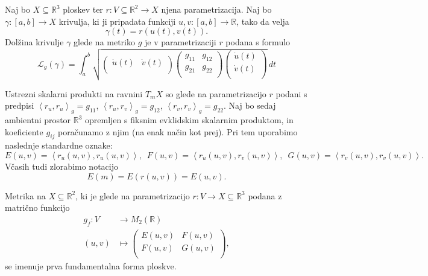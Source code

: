 \begin{definicija}
\label{def_dolzina_krivulje}
Naj bo $X \subseteq \mathbb{R}^3$ ploskev ter $r: V \subseteq \mathbb{R}^2 \to X$ njena parametrizacija. Naj bo $\gamma: [a,b] \to  X$ krivulja, ki ji pripadata funkciji $u, v: [a,b] \to  \mathbb{R}$, tako da velja \begin{equation*}
\gamma(t) = r(u(t), v(t)).
\end{equation*}  
   Dolžina krivulje $\gamma$ glede na metriko $g$ je v parametrizaciji $r$ podana s formulo 
\begin{equation*} \mathcal{L}_g(\gamma) = \int_{a}^{b} \sqrt{ 
\begin{pmatrix}
    \dot{u}(t) & \dot{v}(t) \\
\end{pmatrix}
\begin{pmatrix}
	g_{11} & g_{12}  \\
	g_{21} & g_{22} \\
\end{pmatrix}
\begin{pmatrix}
	\dot{u}(t) \\
	\dot{v}(t) \\
\end{pmatrix}
}  \, dt  \end{equation*}
\end{definicija}


Ustrezni skalarni produkti na ravnini $T_mX$ so glede na
parametrizacijo $r$ podani s predpisi $\left<r_u, r_u \right>_g  =
g_{11}$, $\left<r_u, r_v \right>_g  =
g_{12}$, $\left<r_v, r_v \right>_g  =
g_{22}$. Naj bo sedaj ambientni prostor $\mathbb{R}^3$ opremljen s
fiksnim evklidskim skalarnim produktom, in koeficiente $g_{ij}$
poračunamo z njim (na enak način kot prej). Pri tem uporabimo
naslednje standardne oznake: 
\begin{equation*} E(u,v) = \left<r_u(u,v), r_u(u,v) \right>,   \,\,\,   F(u,v) =  \left<r_u(u,v),
r_v(u,v) \right>, \,\,\,     G(u,v) =  \left<r_v(u,v), r_v(u,v)
\right>.  \end{equation*}
Včasih tudi zlorabimo notacijo 
\begin{equation*} E(m) = E(r(u,v)) = E(u,v). \end{equation*}

\begin{definicija}
\label{def_prva_fundamentalna_forma}
 Metrika na $X \subseteq  \mathbb{R}^2$, ki je glede na parametrizacijo $r: V \to  X
\subseteq  \mathbb{R}^3$ podana z matrično funkcijo \begin{align*}
 	g_f: V &\longrightarrow M_2(\mathbb{R}) \\
	(u,v) &\longmapsto 
\begin{pmatrix}
	E(u,v) & F(u,v) \\
	F(u,v) & G(u,v) \\
\end{pmatrix},
\end{align*}
se imenuje prva fundamentalna forma ploskve.
\end{definicija}

